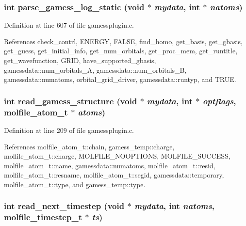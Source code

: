\subsubsection{\setlength{\rightskip}{0pt plus 5cm}int parse\_\-gamess\_\-log\_\-static (void $\ast$ {\em mydata}, int $\ast$ {\em natoms})}\label{gamessplugin_8c_a13}




Definition at line 607 of file gamessplugin.c.

References check\_\-contrl, ENERGY, FALSE, find\_\-homo, get\_\-basis, get\_\-gbasis, get\_\-guess, get\_\-initial\_\-info, get\_\-num\_\-orbitals, get\_\-proc\_\-mem, get\_\-runtitle, get\_\-wavefunction, GRID, have\_\-supported\_\-gbasis, gamessdata::num\_\-orbitals\_\-A, gamessdata::num\_\-orbitals\_\-B, gamessdata::numatoms, orbital\_\-grid\_\-driver, gamessdata::runtyp, and TRUE.
\subsubsection{\setlength{\rightskip}{0pt plus 5cm}int read\_\-gamess\_\-structure (void $\ast$ {\em mydata}, int $\ast$ {\em optflags}, {\bf molfile\_\-atom\_\-t} $\ast$ {\em atoms})\hspace{0.3cm}{\tt  [static]}}\label{gamessplugin_8c_a5}




Definition at line 209 of file gamessplugin.c.

References molfile\_\-atom\_\-t::chain, gamess\_\-temp::charge, molfile\_\-atom\_\-t::charge, MOLFILE\_\-NOOPTIONS, MOLFILE\_\-SUCCESS, molfile\_\-atom\_\-t::name, gamessdata::numatoms, molfile\_\-atom\_\-t::resid, molfile\_\-atom\_\-t::resname, molfile\_\-atom\_\-t::segid, gamessdata::temporary, molfile\_\-atom\_\-t::type, and gamess\_\-temp::type.
\subsubsection{\setlength{\rightskip}{0pt plus 5cm}int read\_\-next\_\-timestep (void $\ast$ {\em mydata}, int {\em natoms}, {\bf molfile\_\-timestep\_\-t} $\ast$ {\em ts})\hspace{0.3cm}{\tt  [static]}}\label{gamessplugin_8c_a6}





